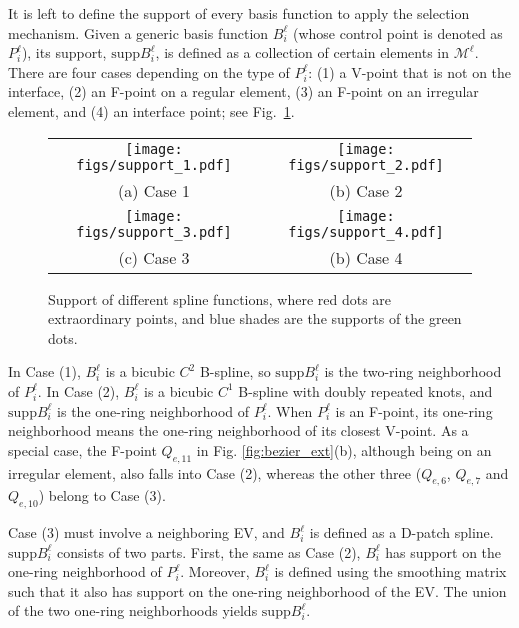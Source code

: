 \documentclass[graybox]{svmult}
\begin{document}
It is left to define the support of every basis function to apply the selection mechanism. Given a generic basis function $B_i^\ell$ (whose control point is denoted as $P_i^\ell$), its support, $\mathrm{supp}B_i^\ell$, is defined as a collection of certain elements in $\mathcal{M}^\ell$. There are four cases depending on the type of $P_i^\ell$: (1) a V-point that is not on the interface, (2) an F-point on a regular element, (3) an F-point on an irregular element, and (4) an interface point; see Fig.~\ref{fig:support}.

\begin{figure}[htb]
\centering
\begin{tabular}{cc}
\texttt{[image: figs/support\_1.pdf]} & \hspace{+1mm}
\texttt{[image: figs/support\_2.pdf]} \\
(a) Case 1 & (b) Case 2 \\
\texttt{[image: figs/support\_3.pdf]} & \hspace{+1mm}
\texttt{[image: figs/support\_4.pdf]} \\
(c) Case 3 & (b) Case 4 \\
\end{tabular}
\caption{Support of different spline functions, where red dots are extraordinary points, and blue shades are the supports of the green dots.}
\label{fig:support}
\end{figure}

In Case (1), $B_i^\ell$ is a bicubic $C^2$ B-spline, so $\mathrm{supp}B_i^\ell$ is the two-ring neighborhood of $P_i^\ell$. In Case (2), $B_i^\ell$ is a bicubic $C^1$ B-spline with doubly repeated knots, and $\mathrm{supp}B_i^\ell$ is the one-ring neighborhood of $P_i^\ell$. When $P_i^\ell$ is an F-point, its one-ring neighborhood means the one-ring neighborhood of its closest V-point. As a special case, the F-point $Q_{e,11}$ in Fig. \ref{fig:bezier_ext}(b), although being on an irregular element, also falls into Case (2), whereas the other three ($Q_{e,6}$, $Q_{e,7}$ and $Q_{e,10}$) belong to Case (3). 

Case (3) must involve a neighboring EV, and $B_i^\ell$ is defined as a D-patch spline. $\mathrm{supp}B_i^\ell$ consists of two parts. First, the same as Case (2), $B_i^\ell$ has support on the one-ring neighborhood of $P_i^\ell$. Moreover, $B_i^\ell$ is defined using the smoothing matrix such that it also has support on the one-ring neighborhood of the EV. The union of the two one-ring neighborhoods yields $\mathrm{supp}B_i^\ell$.
\end{document}
